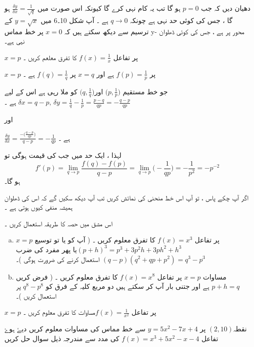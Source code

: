 دھیان دیں کہ جب \(p=0\) ہو گا تب یہ کام نہی کرے گا  کیونکہ اس صورت میں \(\frac{\delta y}{\delta x}=\frac{1}{\sqrt{q}}\)  ہو گا ، جس کی کوئی حد نہی ہے چونکہ \(q \to 0\) ہے ۔ آپ شکل 10۔6 میں \(y=\sqrt{x}\) کے ترسیم سے دیکھ سکتے ہیں کہ \(x=0\) پر خط مماس y- محور پر ہے ، جس کی کوئی ڈھلوان نہی ہے۔ 


\(x=p\)  پر تفاعل \(f(x)=\frac{1}{x}\) کا تفرق معلعم کریں ۔ 

\(x=p\) پر \(f(p)=\frac{1}{p}\) ہے اور \(x=q\) پر \(f(q)=\frac{1}{q}\) ہے ۔

جو خط مستقیم \(\big( p,\frac{1}{p} \big)\) اور\(\big( q,\frac{1}{q} \big)\) کو ملا رہی ہے اس کے لیے \(\delta x=q-p, \, \delta y=\frac{1}{q}-\frac{1}{p}=\frac{p-q}{qp}=-\frac{q-p}{qp}\) ہے ۔

اور 

\(\frac{\delta y}{\delta x}=\frac{-\big( \frac{q-p}{qp}\big)}{q-p}=-\frac{1}{qp}\) ہے ۔ 

لہذا ، ایک حد میں جب  کی قیمت ہوگی تو \[f'(p)=\lim_{q \to p} \frac{f(q)-f(p)}{q-p}=\lim_{q \to p} \big( -\frac{1}{qp}\big)=-\frac{1}{p^2}=-p^{-2}\] ہو گا۔ 

اگر آپ چکے پاس ، تو آپ اس خط منحنی کی نمائش کریں تب آپ دیکھ سکیں گے کہ اس کی ڈھلوان ہمیشہ منفی کیوں ہوتی ہے ۔ 


اس مشق میں حصہ    کا طریقہ استعمال کریں ۔
\begin{enumerate}[a.]
\item  
\(x=p\) پر تفاعل \(f(x)=x^3\) کا تفرق معلوم کریں ۔ ( آپ کو یا تو توسیع \((p+h)^3=p^3+3p^2h+3ph^2+h^3\)یا پھر مفرد کی ضرب \((q-p)(q^2+qp+p^2)=q^3-p^3\)  استعمال کرنے کی ضرورت ہوگی )۔
\item 
مساوات \(x=p\) پر تفاعل \(f(x)=x^8\) کا تفرق معلوم کریں ۔ ( فرض کریں \(p+h=q\) ہے اور جتنی بار آپ کر سکتے ہیں دو مربع  کلیہ کے فرق کو   \(q^8-p^8\) 
   پر استعمال کریں )۔
 \end{enumerate}



\(x=p\) پر تفاعل \(f(x)=\frac{1}{x^2}\)مساوات 
 کا تفرق معلوم کریں ۔

 نقطہ\( (2,10)  \) پر  \(y=5x^2-7x+4\) سے خط مماس کی مساوات معلوم کریں  
  دیۓ ہوۓ تفاعل \(f(x)=x^3+5x^2-x-4\) کی مدد سے مندرجہ ذیل سوال حل کریں 

